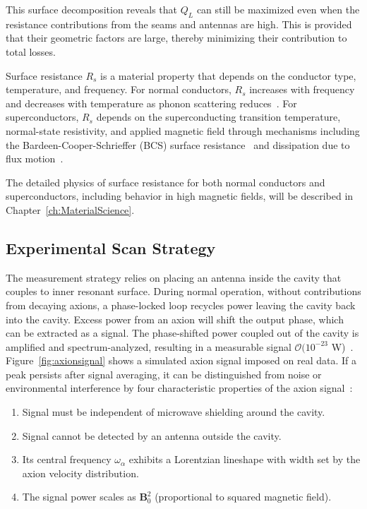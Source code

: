     This surface decomposition reveals that $Q_L$ can still be maximized even when the resistance contributions from the seams and antennas are high. This is provided that their geometric factors are large, thereby minimizing their contribution to total losses.
        
    Surface resistance $R_s$ is a material property that depends on the conductor type, temperature, and frequency. For normal conductors, $R_s$ increases with frequency and decreases with temperature as phonon scattering reduces~\cite{ashcroftSolidStatePhysics1976}. For superconductors, $R_s$ depends on the superconducting transition temperature, normal-state resistivity, and applied magnetic field through mechanisms including the Bardeen-Cooper-Schrieffer (BCS) surface resistance~\cite{bardeenTheoryMeissnerEffect1955} and dissipation due to flux motion~\cite{campbellResponsePinnedFlux1969}.
    
    The detailed physics of surface resistance for both normal conductors and superconductors, including behavior in high magnetic fields, will be described in Chapter~\ref{ch:MaterialScience}.

    \subsection{Experimental Scan Strategy}

    The measurement strategy relies on placing an antenna inside the cavity that couples to inner resonant surface. During normal operation, without contributions from decaying axions, a phase-locked loop recycles power leaving the cavity back into the cavity. Excess power from an axion will shift the output phase, which can be extracted as a signal. The phase-shifted power coupled out of the cavity is amplified and spectrum-analyzed, resulting in a measurable signal $\mathcal{O} (10^{-23}$ W)~\cite{ADMX:2018gho}. Figure~\ref{fig:axionsignal} shows a simulated axion signal imposed on real data. If a peak persists after signal averaging, it can be distinguished from noise or environmental interference by four characteristic properties of the axion signal~\cite{Sikivie:2020zpn}:
    
    \begin{enumerate}
        \item Signal must be independent of microwave shielding around the cavity.
        \item Signal cannot be detected by an antenna outside the cavity.
        \item Its central frequency $\omega_\alpha$ exhibits a Lorentzian lineshape with width set by the axion velocity distribution.
        \item The signal power scales as $\mathbf{B}_0^2$ (proportional to squared magnetic field).
    \end{enumerate}

